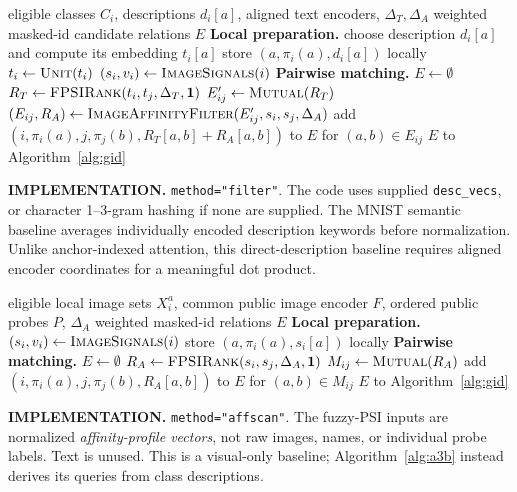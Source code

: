 \documentclass[11pt]{article}
\newcommand{\mutual}{\textsc{Mutual}}
\newcommand{\unit}{\textsc{Unit}}
\newcommand{\fprank}{\textsc{FPSIRank}}
\newcommand{\imagesig}{\textsc{ImageSignals}}
\begin{document}
\begin{algorithm}[p]
\caption{Fuzzy description PSI followed by the original image-affinity filter}
\label{alg:a2}
\small\begin{algorithmic}[1]
\Require eligible classes $C_i$, descriptions $d_i[a]$, aligned text encoders, $\Delta_T,\Delta_A$
\Ensure weighted masked-id candidate relations $E$
\Statex \textbf{Local preparation.}
  \State choose description $d_i[a]$ and compute its embedding $t_i[a]$
  \State store $(a,\pi_i(a),d_i[a])$ locally
 \EndFor
 \State $t_i\gets\unit(t_i)$
 \State $(s_i,v_i)\gets\imagesig(i)$ 
\EndFor
\Statex \textbf{Pairwise matching.}
\State $E\gets\emptyset$
 \State $R_T\gets\fprank(t_i,t_j,\Delta_T,\mathbf{1})$
 \State $E'_{ij}\gets\mutual(R_T)$
 \State $(E_{ij},R_A)\gets\textsc{ImageAffinityFilter}(E'_{ij},s_i,s_j,\Delta_A)$
 \State add $(i,\pi_i(a),j,\pi_j(b),R_T[a,b]+R_A[a,b])$ to $E$ for $(a,b)\in E_{ij}$
\EndFor
\State \Return $E$ to Algorithm~\ref{alg:gid}
\Statex \hrulefill
\Statex \raggedright\textbf{IMPLEMENTATION.} \texttt{method="filter"}. The code uses supplied
\texttt{desc\_vecs}, or character 1--3-gram hashing if none are supplied. The
MNIST semantic baseline averages individually encoded description keywords
before normalization. Unlike anchor-indexed attention, this direct-description
baseline requires aligned encoder coordinates for a meaningful dot product.
\end{algorithmic}\end{algorithm}

\begin{algorithm}[p]
\caption{Affinity-generated descriptions: image profiles directly drive fuzzy PSI}
\label{alg:a3}
\small\begin{algorithmic}[1]
\Require eligible local image sets $X_i^a$, common public image encoder $F$, ordered public probes $P$, $\Delta_A$
\Ensure weighted masked-id relations $E$
\Statex \textbf{Local preparation.}
 \State $(s_i,v_i)\gets\imagesig(i)$ 
  \State store $(a,\pi_i(a),s_i[a])$ locally
 \EndFor
\EndFor
\Statex \textbf{Pairwise matching.}
\State $E\gets\emptyset$
 \State $R_A\gets\fprank(s_i,s_j,\Delta_A,\mathbf{1})$
 \State $M_{ij}\gets\mutual(R_A)$
 \State add $(i,\pi_i(a),j,\pi_j(b),R_A[a,b])$ to $E$ for $(a,b)\in M_{ij}$
\EndFor
\State \Return $E$ to Algorithm~\ref{alg:gid}
\Statex \hrulefill
\Statex \raggedright\textbf{IMPLEMENTATION.} \texttt{method="affscan"}. The fuzzy-PSI inputs
are normalized \emph{affinity-profile vectors}, not raw images, names, or
individual probe labels. Text is unused. This is a visual-only baseline;
Algorithm~\ref{alg:a3b} instead derives its queries from class descriptions.
\end{algorithmic}\end{algorithm}
\end{document}
